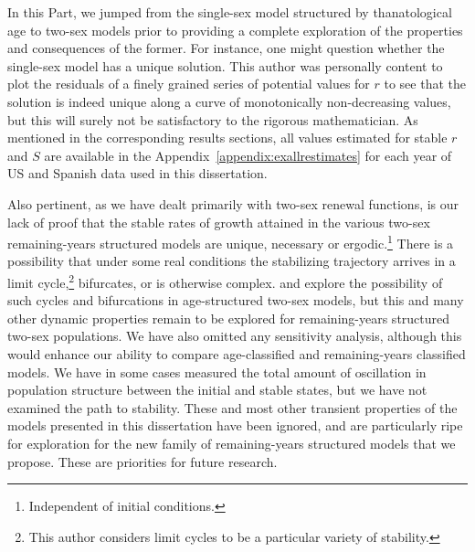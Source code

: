 \FloatBarrier
In this Part, we jumped from the single-sex model structured by
thanatological age to two-sex models prior to providing a complete
exploration of the properties and consequences of the former. For instance, one
might question whether the single-sex model has a unique solution. This author
was personally content to plot the residuals of a finely grained series of potential
values for $r$ to see that the solution is indeed unique along a curve of
monotonically non-decreasing values, but this will surely not be satisfactory to
the rigorous mathematician. As mentioned in the corresponding results sections,
all values estimated for stable $r$ and $S$ are available in the
Appendix~\ref{appendix:exallrestimates} for each year of US and Spanish data
used in this dissertation.

Also pertinent, as we have dealt primarily with two-sex renewal functions,
is our lack of proof that the stable rates of growth attained in the
various two-sex remaining-years structured models are unique, necessary or
ergodic.\footnote{Independent 
of initial conditions.} There is a possibility that under some real conditions
the stabilizing trajectory arrives in a limit cycle,\footnote{This author considers 
limit cycles to be a particular variety of stability.} bifurcates, or is
otherwise complex. \citet{wijewickrema1980weak} and \citet{chung1990phd, chung1994cycles}
explore the possibility of such cycles and bifurcations in age-structured
two-sex models, but this and many other dynamic properties remain to be explored for 
remaining-years structured two-sex populations. We have also omitted any
sensitivity analysis, although this would enhance our ability to compare age-classified 
and remaining-years classified models. We have in some cases measured the total
amount of oscillation in population structure between the initial and stable states, but
we have not examined the path to stability. These and most
other transient properties of the models presented in this dissertation have
been ignored, and are particularly ripe for exploration for the new family of
remaining-years structured models that we propose. These are priorities for
future research.

